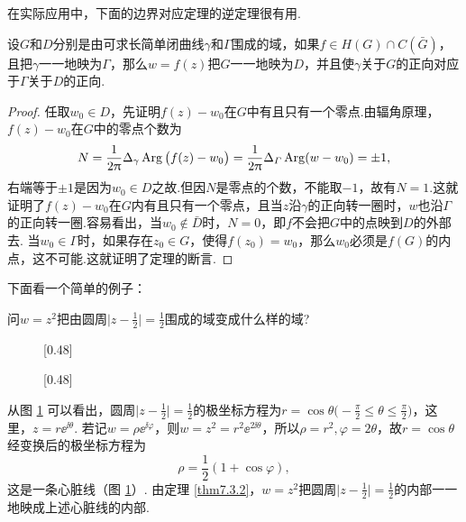 在实际应用中，下面的边界对应定理的逆定理很有用.
\begin{theorem}\label{thm7.3.2}
  设$G$和$D$分别是由可求长简单闭曲线$\gamma$和$\Gamma$围成的域，如果$f\in H(G)\cap C(\bar G)$，且把$\gamma$一一地映为$\Gamma$，那么$w=f(z)$把$G$一一地映为$D$，并且使$\gamma$关于$G$的正向对应于$\Gamma$关于$D$的正向.
\end{theorem}
\begin{proof}
  任取$w_0\in D$，先证明$f(z)-w_0$在$G$中有且只有一个零点.由辐角原理，$f(z)-w_0$在$G$中的零点个数为
  \[
    N = \frac1{2\uppi}\Delta_\gamma\operatorname{Arg}\big(f(z)-w_0\big) = \frac1{2\uppi}\Delta_\varGamma
    \operatorname{Arg}(w-w_0)=\pm1,
  \]
  右端等于$\pm1$是因为$w_0\in D$之故.但因$N$是零点的个数，不能取$-1$，故有$N=1$.这就证明了$f(z)-w_0$在$G$内有且只有一个零点，且当$z$沿$\gamma$的正向转一圈时，$w$也沿$\Gamma$的正向转一圈.容易看出，当$w_0\notin\bar D$时，$N=0$，即$f$不会把$G$中的点映到$D$的外部去.
  当$w_0\in\Gamma$时，如果存在$z_0\in G$，使得$f(z_0)=w_0$，那么$w_0$必须是$f(G)$的内点，这不可能.这就证明了定理的断言.
\end{proof}

下面看一个简单的例子：
\begin{example}\label{exam7.3.3}
  问$w=z^2$把由圆周$\bigg|z-\frac12\bigg|=\frac12$围成的域变成什么样的域?
\end{example}
\begin{figure}[!ht]
  \centering
  \subcaptionbox{\label{fig7.5a}}[0.48\textwidth]
    {
    }
  \subcaptionbox{\label{fig7.5b}}[0.48\textwidth]
    {
    }
    \caption{\label{fig7.5}}
\end{figure}
\begin{solution}
  从图 \ref{fig7.5} 可以看出，圆周$\bigg|z-\frac12\bigg|=\frac12$的极坐标方程为$r=\cos\theta\bigg(-\frac\pi2\le\theta\le\frac\pi2\bigg)$，这里，$z=r\ee^{\ii\theta}$. 若记$w=\rho\ee^{\ii\varphi}$，则$w=z^2=r^2\ee^{2\ii\theta}$，所以$\rho=r^2,\varphi=2\theta$，故$r=\cos\theta$经变换后的极坐标方程为
  \[
    \rho = \frac12(1+\cos\varphi),
  \]
  这是一条心脏线（图 \ref{fig7.5}）. 由定理 \ref{thm7.3.2}，$w=z^2$把圆周$\bigg|z-\frac12\bigg|=\frac12$的内部一一地映成上述心脏线的内部.
\end{solution}

